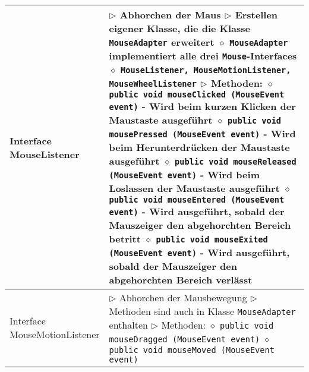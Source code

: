 \begin{longtable}{ | p{} p{} | }
	\makecell[l]{Interface \\ MouseListener} & \makecell[l]{
	$\triangleright$ Abhorchen der Maus \\
	$\triangleright$ Erstellen eigener Klasse, die die Klasse \texttt{MouseAdapter} erweitert \\
	\hspace{0.4cm} $\diamond$ \texttt{MouseAdapter} implementiert alle drei \texttt{Mouse}-Interfaces \\
	\hspace{0.4cm} $\diamond$  \texttt{MouseListener, MouseMotionListener, MouseWheelListener} \\
	$\triangleright$ Methoden: \\
	\hspace{0.4cm} $\diamond$ \texttt{public void mouseClicked (MouseEvent event)} \\
	\hspace{0.6cm} - Wird beim kurzen Klicken der Maustaste ausgeführt \\
	\hspace{0.4cm} $\diamond$ \texttt{public void mousePressed (MouseEvent event)} \\	
	\hspace{0.6cm} - Wird beim Herunterdrücken der Maustaste ausgeführt \\
	\hspace{0.4cm} $\diamond$ \texttt{public void mouseReleased (MouseEvent event)} \\
	\hspace{0.6cm} - Wird beim Loslassen der Maustaste ausgeführt \\
	\hspace{0.4cm} $\diamond$ \texttt{public void mouseEntered (MouseEvent event)} \\
	\hspace{0.6cm} - Wird ausgeführt, sobald der Mauszeiger den abgehorchten Bereich betritt \\
	\hspace{0.4cm} $\diamond$ \texttt{public void mouseExited (MouseEvent event)} \\
	\hspace{0.6cm} - Wird ausgeführt, sobald der Mauszeiger den abgehorchten Bereich verlässt} \\ \hline

	\makecell[l]{Interface \\ MouseMotionListener} & \makecell[l]{
	$\triangleright$ Abhorchen der Mausbewegung \\
	$\triangleright$ Methoden sind auch in Klasse \texttt{MouseAdapter} enthalten \\
	$\triangleright$ Methoden: \\
	\hspace{0.4cm} $\diamond$ \texttt{public void mouseDragged (MouseEvent event)} \\
	\hspace{0.4cm} $\diamond$ \texttt{public void mouseMoved (MouseEvent event)}  } \\ \hline


\end{longtable}
